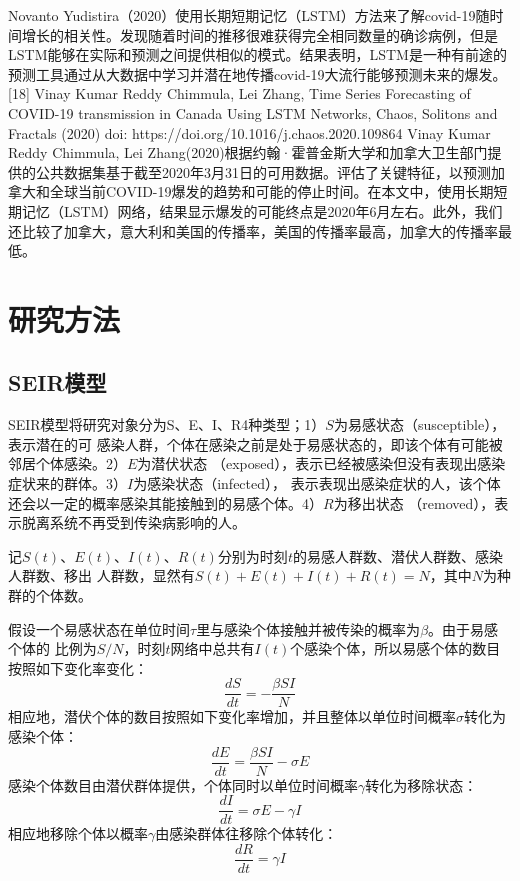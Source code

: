\documentclass[lang=cn,11pt,a4paper,cite=authoryear]{elegantpaper}
\begin{document}
Novanto Yudistira（2020）使用长期短期记忆（LSTM）方法来了解covid-19随时间增长的相关性。发现随着时间的推移很难获得完全相同数量的确诊病例，但是LSTM能够在实际和预测之间提供相似的模式。结果表明，LSTM是一种有前途的预测工具通过从大数据中学习并潜在地传播covid-19大流行能够预测未来的爆发。
[18] Vinay Kumar Reddy Chimmula, Lei Zhang, Time Series Forecasting of COVID-19 transmission in Canada Using LSTM Networks, Chaos, Solitons and Fractals (2020) doi: https://doi.org/10.1016/j.chaos.2020.109864
Vinay Kumar Reddy Chimmula, Lei Zhang(2020)根据约翰·霍普金斯大学和加拿大卫生部门提供的公共数据集基于截至2020年3月31日的可用数据。评估了关键特征，以预测加拿大和全球当前COVID-19爆发的趋势和可能的停止时间。在本文中，使用长期短期记忆（LSTM）网络，结果显示爆发的可能终点是2020年6月左右。此外，我们还比较了加拿大，意大利和美国的传播率，美国的传播率最高，加拿大的传播率最低。

\section{研究方法}

\subsection{SEIR模型}
SEIR模型将研究对象分为S、E、I、R4种类型；1）$S$为易感状态（susceptible），表示潜在的可
感染人群，个体在感染之前是处于易感状态的，即该个体有可能被邻居个体感染。2）$E$为潜伏状态
（exposed），表示已经被感染但没有表现出感染症状来的群体。3）$I$为感染状态（infected），
表示表现出感染症状的人，该个体还会以一定的概率感染其能接触到的易感个体。4）$R$为移出状态
（removed），表示脱离系统不再受到传染病影响的人。

记$S(t)$、$E(t)$、$I(t)$、$R(t)$分别为时刻$t$的易感人群数、潜伏人群数、感染人群数、移出
人群数，显然有$S(t)+E(t)+I(t)+R(t)=N$，其中$N$为种群的个体数。

假设一个易感状态在单位时间$\tau$里与感染个体接触并被传染的概率为$\beta$。由于易感个体的
比例为$S/N$，时刻$t$网络中总共有$I(t)$个感染个体，所以易感个体的数目按照如下变化率变化：
\begin{equation}
\frac{dS}{dt}=-\frac{\beta SI}{N}
\end{equation}
相应地，潜伏个体的数目按照如下变化率增加，并且整体以单位时间概率$\sigma$转化为感染个体：
\begin{equation}
\frac{dE}{dt}=\frac{\beta SI}{N}-\sigma E
\end{equation}
感染个体数目由潜伏群体提供，个体同时以单位时间概率$\gamma$转化为移除状态：
\begin{equation}
\frac{dI}{dt}=\sigma E-\gamma I
\end{equation}
相应地移除个体以概率$\gamma$由感染群体往移除个体转化：
\begin{equation}
\frac{dR}{dt}=\gamma I
\end{equation}
\end{document}
